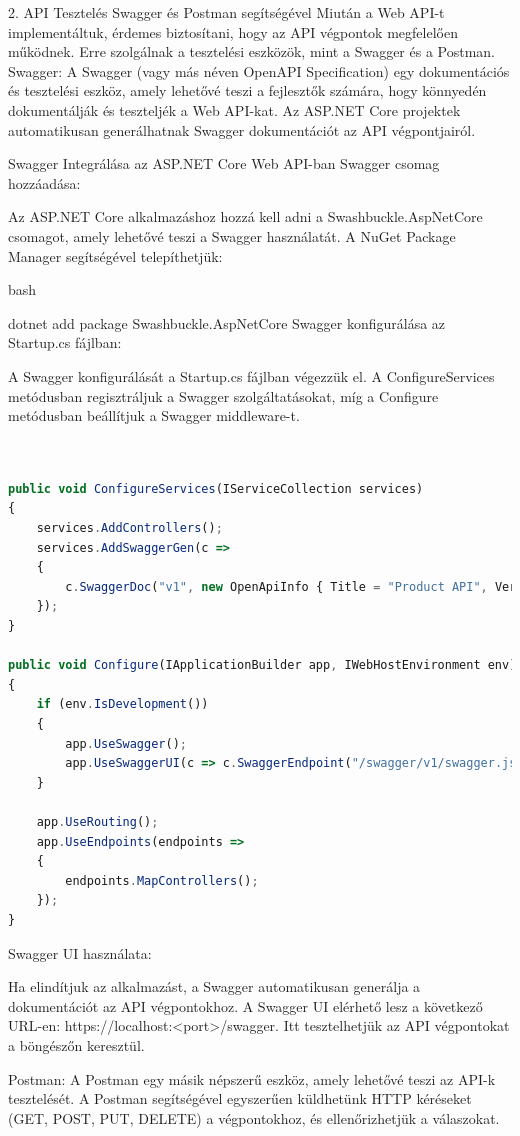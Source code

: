 \documentclass[colorlinks]{thesis-kando}
\theoremstyle{definition}
\theoremstyle{remark}
\begin{document}
2. API Tesztelés Swagger és Postman segítségével
Miután a Web API-t implementáltuk, érdemes biztosítani, hogy az API végpontok megfelelően működnek. Erre szolgálnak a tesztelési eszközök, mint a Swagger és a Postman.
Swagger:
A Swagger (vagy más néven OpenAPI Specification) egy dokumentációs és tesztelési eszköz, amely lehetővé teszi a fejlesztők számára, hogy könnyedén dokumentálják és teszteljék a Web API-kat. Az ASP.NET Core projektek automatikusan generálhatnak Swagger dokumentációt az API végpontjairól.

Swagger Integrálása az ASP.NET Core Web API-ban
Swagger csomag hozzáadása:

Az ASP.NET Core alkalmazáshoz hozzá kell adni a Swashbuckle.AspNetCore csomagot, amely lehetővé teszi a Swagger használatát. A NuGet Package Manager segítségével telepíthetjük:

bash

dotnet add package Swashbuckle.AspNetCore
Swagger konfigurálása az Startup.cs fájlban:

A Swagger konfigurálását a Startup.cs fájlban végezzük el. A ConfigureServices metódusban regisztráljuk a Swagger szolgáltatásokat, míg a Configure metódusban beállítjuk a Swagger middleware-t.


\begin{lstlisting}[language=JavaScript]
	
	
public void ConfigureServices(IServiceCollection services)
{
	services.AddControllers();
	services.AddSwaggerGen(c =>
	{
		c.SwaggerDoc("v1", new OpenApiInfo { Title = "Product API", Version = "v1" });
	});
}

public void Configure(IApplicationBuilder app, IWebHostEnvironment env)
{
	if (env.IsDevelopment())
	{
		app.UseSwagger();
		app.UseSwaggerUI(c => c.SwaggerEndpoint("/swagger/v1/swagger.json", "Product API v1"));
	}
	
	app.UseRouting();
	app.UseEndpoints(endpoints =>
	{
		endpoints.MapControllers();
	});
}
\end{lstlisting}

Swagger UI használata:

Ha elindítjuk az alkalmazást, a Swagger automatikusan generálja a dokumentációt az API végpontokhoz. A Swagger UI elérhető lesz a következő URL-en: https://localhost:<port>/swagger. Itt tesztelhetjük az API végpontokat a böngészőn keresztül.

Postman:
A Postman egy másik népszerű eszköz, amely lehetővé teszi az API-k tesztelését. A Postman segítségével egyszerűen küldhetünk HTTP kéréseket (GET, POST, PUT, DELETE) a végpontokhoz, és ellenőrizhetjük a válaszokat.
\end{document}
